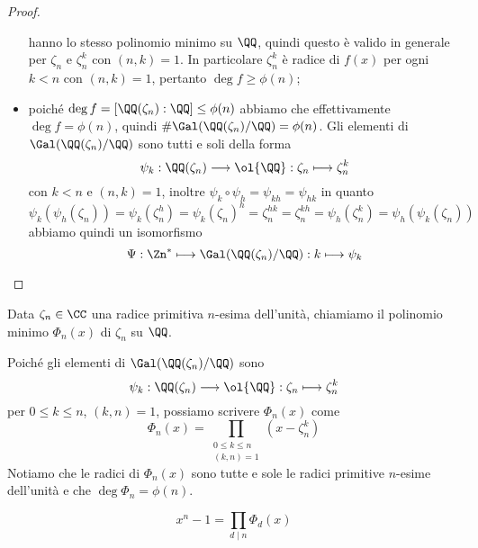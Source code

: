 \documentclass[11pt]{scrartcl}
\begin{document}
\begin{proof}
\begin{itemize}
			hanno lo stesso polinomio minimo su $\QQ$, quindi questo è valido 
			in generale per $\zeta_n$ e $\zeta_n^k$ con $(n, k) = 1$. In particolare
			$\zeta_n^k$ è radice di $f(x)$ per ogni $k < n$ con $(n, k) = 1$, pertanto 
			$\deg f \geq \phi(n)$;
			\item poiché $\deg f = [\QQ(\zeta_n):\QQ] \leq \phi(n)$ abbiamo che 
			effettivamente $\deg f = \phi(n)$, quindi $\#\Gal(\QQ(\zeta_n)/\QQ) = \phi(n)$.
			Gli elementi di $\Gal(\QQ(\zeta_n)/\QQ)$ sono tutti e soli della forma
			\[
			\psi_k: \QQ(\zeta_n)\longrightarrow \ol{\QQ}: \zeta_n \longmapsto \zeta_n^k
			\]
			con $k < n$ e $(n, k) = 1$, inoltre $\psi_k\circ\psi_h = \psi_{kh} = \psi_{hk}$
			in quanto 
			\[
			\psi_k(\psi_h(\zeta_n)) = \psi_k(\zeta_n^h) = \psi_k(\zeta_n)^h =
			\zeta_n^{hk} = \zeta_n^{kh} = \psi_h(\zeta_n^k) = \psi_h(\psi_k(\zeta_n))
			\]
			abbiamo quindi un isomorfismo 
			\[
			\Psi: \Zn^* \longmapsto \Gal(\QQ(\zeta_n)/\QQ):k \longmapsto \psi_k
			\]
		\end{itemize}
	\end{proof}
	
	\begin{definition}
		Data $\zeta_n \in \CC$ una radice primitiva $n$-esima dell'unità, chiamiamo
		 il polinomio minimo $\Phi_n(x)$
		di $\zeta_n$ su $\QQ$.
	\end{definition}
	
	\begin{remark}
		Poiché gli elementi di $\Gal(\QQ(\zeta_n)/\QQ)$ sono
		\[
		\psi_k: \QQ(\zeta_n) \longrightarrow \ol{\QQ}: \zeta_n \longmapsto \zeta_n^k
		\]
		per $0 \leq k \leq n$, $(k, n) = 1$, possiamo scrivere $\Phi_n(x)$ come 
		\[
		\Phi_n(x) = \prod_{\substack{0\leq k \leq n\\(k, n) = 1}}(x - \zeta_n^k)
		\]
		Notiamo che le radici di $\Phi_n(x)$ sono tutte e sole le radici primitive
		$n$-esime dell'unità e che $\deg\Phi_n = \phi(n)$.
	\end{remark}
	
	\begin{proposition}
		\[
		x^n - 1 = \prod_{d\mid n}\Phi_d(x)
		\]
	\end{proposition}
	
\end{document}
